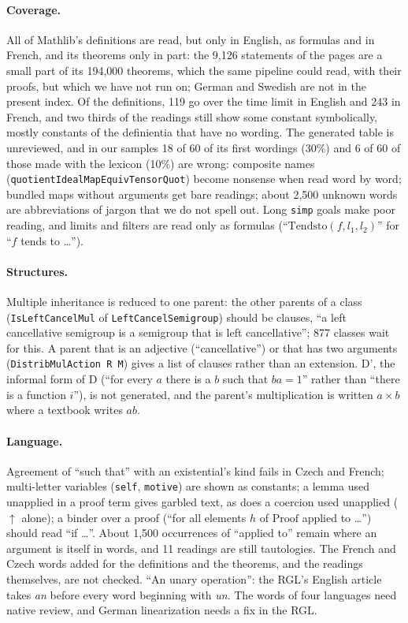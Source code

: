 \documentclass{easychair}
\newcommand{\ttt}[1]{\texttt{#1}}
\begin{document}
\paragraph{Coverage.} All of Mathlib's definitions are read, but only in English, as formulas
and in French, and its
theorems only in part: the 9,126 statements of the pages are a small part of its 194,000
theorems, which the same pipeline could read, with their proofs, but which we have not run on;
German and Swedish are not in the present index. Of the
definitions, 119 go over the time limit in English and 243 in French, and two thirds of the readings still show some constant
symbolically, mostly constants of the definientia that have no wording. The generated table is
unreviewed, and in our samples 18 of 60 of its first wordings (30\%) and 6 of 60 of those made with
the lexicon (10\%) are wrong: composite names
(\ttt{quotientIdealMapEquivTensorQuot}) become nonsense when read word by word; bundled maps
without arguments get bare readings; about 2,500 unknown words are abbreviations of jargon that
we do not spell out. Long \ttt{simp} goals make poor reading, and limits and filters are read
only as formulas (``$\mathrm{Tendsto}(f, l_1, l_2)$'' for ``$f$ tends to \ldots'').

\paragraph{Structures.} Multiple inheritance is reduced to one parent: the other parents of a
class (\ttt{IsLeftCancelMul} of \ttt{LeftCancelSemigroup}) should be clauses, ``a left
cancellative semigroup is a semigroup that is left cancellative''; 877 classes wait for this.
A parent that is an adjective (``cancellative'') or that has two arguments
(\ttt{DistribMulAction R M}) gives a list of clauses rather than an extension. D', the
informal form of D (``for every $a$ there is a $b$ such that $ba = 1$'' rather than ``there is
a function $i$''), is not generated, and the parent's multiplication is written $a \times b$
where a textbook writes $ab$.

\paragraph{Language.} Agreement of ``such that'' with an existential's kind fails in Czech and
French; multi-letter variables (\ttt{self}, \ttt{motive}) are shown as constants; a lemma used
unapplied in a proof term gives garbled text, as does a coercion used unapplied
($\uparrow$ alone); a binder over a proof (``for all elements $h$ of $\mathrm{Proof}$ applied to
\ldots'') should read ``if \ldots''. About 1,500 occurrences of
``applied to'' remain where an
argument is itself in words, and 11 readings are still tautologies. The French and Czech words
added for the definitions and the theorems, and the readings themselves, are not checked. ``An unary operation'': the RGL's English
article takes \emph{an} before every word beginning with \emph{un}. The words of four languages need native review,
and German linearization needs a fix in the RGL.
\end{document}
